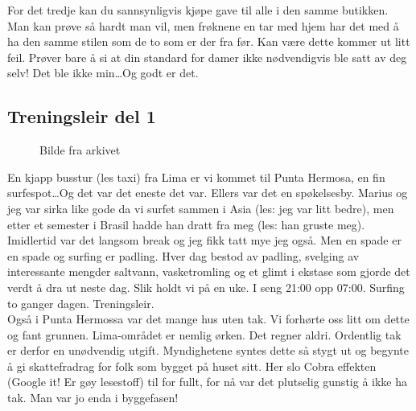 For det tredje kan du sannsynligvis kjøpe gave til alle i den samme
butikken. Man kan prøve så hardt man vil, men frøknene en tar med hjem
har det med å ha den samme stilen som de to som er der fra før. Kan
være dette kommer ut litt feil. Prøver bare å si at din standard for
damer
ikke nødvendigvis ble satt av deg selv! Det ble ikke min\ldots Og godt er det.\\

\subsection*{Treningsleir del 1}


\begin{figure}[H]
	\centering
	\noindent{}
	\caption*{Bilde fra arkivet}
\label{fig:takeropskrytt}
\end{figure}
En kjapp busstur (les taxi) fra Lima er vi kommet til Punta Hermosa,
en fin surfespot\ldots Og det var det eneste det var. Ellers var det en
spøkelsesby. Marius og jeg var sirka like gode da vi
surfet sammen i Asia (les: jeg var litt bedre), men etter et semester i Brasil hadde han dratt
fra meg (les: han gruste meg). Imidlertid var det langsom break og jeg fikk tatt
mye jeg også. Men en spade er en spade og surfing er padling. Hver dag
bestod av padling,
svelging av interessante mengder saltvann, vasketromling og et glimt
i ekstase som gjorde det verdt å dra ut neste dag. Slik holdt vi på en
uke. I seng 21:00 opp 07:00. Surfing to ganger dagen. Treningsleir.\\



Også i Punta Hermossa var det mange hus uten tak. Vi forhørte oss litt
om dette og fant grunnen. Lima-området er nemlig ørken. Det regner
aldri. Ordentlig tak er derfor en unødvendig utgift. Myndighetene
syntes dette så stygt ut og begynte å gi skattefradrag for folk som
bygget på huset sitt. Her slo Cobra effekten (Google it!
Er gøy lesestoff) til for fullt, for nå var det plutselig gunstig å ikke
ha tak. Man var jo enda i byggefasen!


